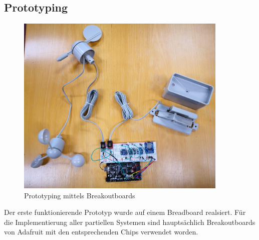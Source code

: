 \subsection{Prototyping}
\label{subsec:proto}
\begin{figure}[hbtp]
\centering
\includegraphics[width=0.9\textwidth]{graphics/prototyping/komplett.jpg} 
\caption{Prototyping mittels Breakoutboards}
\end{figure}

Der erste funktionierende Prototyp wurde auf einem Breadboard realsiert. Für die Implementierung aller partiellen Systemen sind hauptsächlich Breakoutboards von Adafruit mit den entsprechenden Chips verwendet worden.\\

